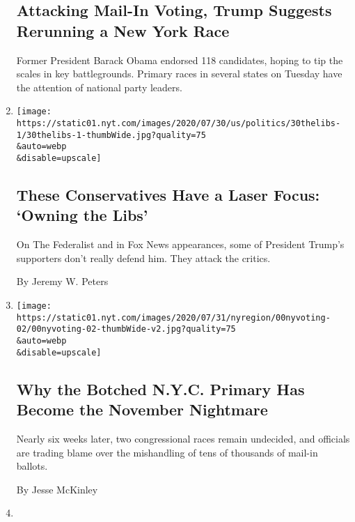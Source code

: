 \begin{enumerate}
  \hypertarget{attacking-mail-in-voting-trump-suggests-rerunning-a-new-york-race}{%
  \subsection{Attacking Mail-In Voting, Trump Suggests Rerunning a New
  York
  Race}\label{attacking-mail-in-voting-trump-suggests-rerunning-a-new-york-race}}

  Former President Barack Obama endorsed 118 candidates, hoping to tip
  the scales in key battlegrounds. Primary races in several states on
  Tuesday have the attention of national party leaders.
\item
  \href{/2020/08/03/us/politics/the-federalist-trump-liberals.html}{}

  \texttt{[image: https://static01.nyt.com/images/2020/07/30/us/politics/30thelibs-1/30thelibs-1-thumbWide.jpg?quality=75\\\&auto=webp\\\&disable=upscale]}

  \hypertarget{these-conservatives-have-a-laser-focus-owning-the-libs}{%
  \subsection{These Conservatives Have a Laser Focus: `Owning the
  Libs'}\label{these-conservatives-have-a-laser-focus-owning-the-libs}}

  On The Federalist and in Fox News appearances, some of President
  Trump's supporters don't really defend him. They attack the critics.

  By Jeremy W. Peters
\item
  \href{/2020/08/03/nyregion/nyc-mail-ballots-voting.html}{}

  \texttt{[image: https://static01.nyt.com/images/2020/07/31/nyregion/00nyvoting-02/00nyvoting-02-thumbWide-v2.jpg?quality=75\\\&auto=webp\\\&disable=upscale]}

  \hypertarget{why-the-botched-nyc-primary-has-become-the-november-nightmare}{%
  \subsection{Why the Botched N.Y.C. Primary Has Become the November
  Nightmare}\label{why-the-botched-nyc-primary-has-become-the-november-nightmare}}

  Nearly six weeks later, two congressional races remain undecided, and
  officials are trading blame over the mishandling of tens of thousands
  of mail-in ballots.

  By Jesse McKinley
\item
  \href{/2020/08/02/us/politics/coronavirus-vaccine.html}{}


\end{enumerate}

